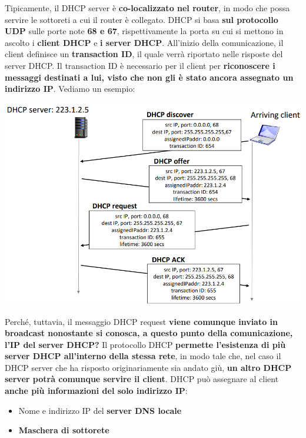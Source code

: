 \documentclass[12pt]{article}
\begin{document}
Tipicamente, il DHCP server è \textbf{co-localizzato nel router}, in modo che possa servire le sottoreti a cui il router è collegato.
DHCP si basa \textbf{sul protocollo UDP} sulle porte note \textbf{68 e 67}, rispettivamente la porta su cui si mettono in ascolto i \textbf{client DHCP} e \textbf{i server DHCP}.
All'inizio della comunicazione, il client definisce un \textbf{transaction ID}, il quale verrà riportato nelle risposte del server DHCP. Il transaction ID è necessario per il client
per \textbf{riconoscere i messaggi destinati a lui, visto che non gli è stato ancora assegnato un indirizzo IP}. Vediamo un esempio:
\begin{center}
    \includegraphics[width =0.90\linewidth]{Images/89.png}
\end{center}
Perché, tuttavia, il messaggio DHCP request \textbf{viene comunque inviato in broadcast nonostante si conosca, a questo punto della comunicazione, l'IP del server DHCP?}
Il protocollo DHCP \textbf{permette l'esistenza di più server DHCP all'interno della stessa rete}, in modo tale che, nel caso il DHCP server che ha risposto originariamente sia andato giù, \textbf{un altro DHCP server potrà comunque servire il client}.
DHCP può assegnare al client \textbf{anche più informazioni del solo indirizzo IP}:
\begin{itemize}
    \item Nome e indirizzo IP del \textbf{server DNS locale}
    \item \textbf{Maschera di sottorete}
\end{itemize}
\end{document}
